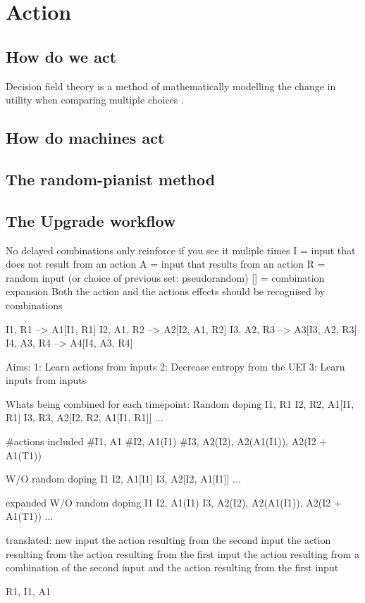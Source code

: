 \chapter{Action}
\section{How do we act}
Decision field theory is a method of mathematically modelling the change in utility when comparing multiple choices \cite{busemeyer2002survey}.

\section{How do machines act}

\section{The random-pianist method}


\section{The Upgrade workflow}
No delayed combinations
only reinforce if you see it muliple times
I = input that does not result from an action
A = input that results from an action
R = random input (or choice of previous set: pseudorandom)
[] = combination expansion
Both the action and the actions effects should be recognised by combinations

I1, R1        -->    A1[I1, R1]
I2, A1, R2    -->    A2[I2, A1, R2]
I3, A2, R3    -->    A3[I3, A2, R3]
I4, A3, R4    -->    A4[I4, A3, R4]

Aims:
1: Learn actions from inputs
2: Decrease entropy from the UEI
3: Learn inputs from inputs

Whats being combined for each timepoint:
Random doping
I1, R1
I2, R2, A1[I1, R1]
I3, R3, A2[I2, R2, A1[I1, R1]]
...

#actions included
#I1, A1
#I2, A1(I1)
#I3, A2(I2), A2(A1(I1)), A2(I2 + A1(T1))

W/O random doping
I1
I2, A1[I1]
I3, A2[I2, A1[I1]]
...

expanded W/O random doping
I1
I2, A1(I1)
I3, A2(I2), A2(A1(I1)), A2(I2 + A1(T1))
...

translated:
new input
the action resulting from the second input
the action resulting from the action resulting from the first input
the action resulting from a combination of the second input and the action resulting from the first input 

R1, I1, A1
